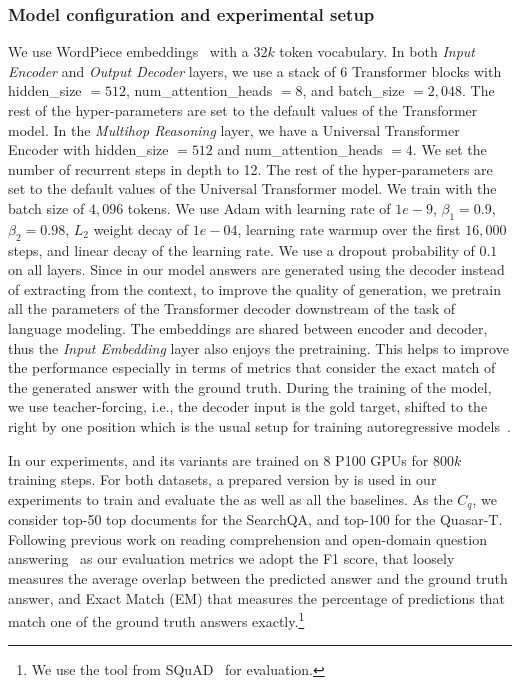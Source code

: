 \subsubsection{Model configuration and experimental setup}
We use WordPiece embeddings~\citep{wu:2016:google} with a $32k$ token vocabulary. 
%
In both \emph{Input Encoder} and \emph{Output Decoder} layers, we use 
a stack of 6 Transformer blocks with hidden\_size $= 512$, num\_attention\_heads $=8$, and batch\_size $=2,048$. 
The rest of the hyper-parameters are set to the default values of the Transformer model.
%
In the \emph{Multihop Reasoning} layer, we have a Universal Transformer Encoder with hidden\_size $=512$ and num\_attention\_heads $=4$. 
We set the number of recurrent steps in depth to 12. The rest of the hyper-parameters are set to the default values of the Universal Transformer model.
%
We train with the batch size of $4,096$ tokens. We use Adam with learning rate of $1e-9$, $\beta_1 = 0.9$, $\beta_2 = 0.98$, $L_2$ weight decay of $1e-04$, learning rate warmup over the first $16,000$ steps, and linear decay of the learning rate. 
We use a dropout probability of $0.1$ on all layers.
%
Since in our model answers are generated using the decoder instead of extracting from the context, to improve the quality of generation, we pretrain all the parameters of the Transformer decoder downstream of the task of language modeling. The embeddings are shared between encoder and decoder, thus the \emph{Input Embedding} layer also enjoys the pretraining. This helps to improve the performance especially in terms of metrics that consider the exact match of the generated answer with the ground truth.
%
During the training of the model, we use teacher-forcing, i.e., the decoder input is the gold target, shifted to the right by one position which is the usual setup for training autoregressive models~\citep{williams1989learning}. 

In our experiments, \tracrnet and its variants are trained on 8 P100 GPUs for $800k$ training steps.
%
For both datasets, a prepared version by \citet{wang2017r} is used in our experiments to train and evaluate the \tracrnet as well as all the baselines. As the $C_q$, we consider top-50 top documents for the SearchQA, and top-100 for the Quasar-T.
%
Following previous work on reading comprehension and open-domain question answering~\citep{shen2017reasonet,buck2017ask,wang2017r,wang2017evidence,lin2018denoising} as our evaluation metrics we adopt the F1 score, that loosely measures the average overlap between the predicted answer and the ground truth answer, and Exact Match (EM) that measures the percentage of predictions that match one of the ground truth answers exactly.\footnote{We use the tool from SQuAD~\citep{rajpurkar2016squad} for evaluation.} 

